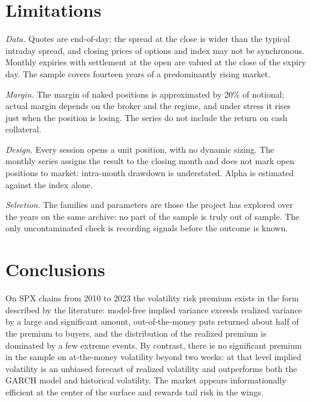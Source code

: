\documentclass[11pt,a4paper]{article}
\begin{document}
\section{Limitations}\label{sec:limiti}

\emph{Data.} Quotes are end-of-day; the spread at the close is wider than the typical intraday spread, and closing prices of options and index may not be synchronous. Monthly expiries with settlement at the open are valued at the close of the expiry day. The sample covers fourteen years of a predominantly rising market.

\emph{Margin.} The margin of naked positions is approximated by 20\% of notional; actual margin depends on the broker and the regime, and under stress it rises just when the position is losing. The series do not include the return on cash collateral.

\emph{Design.} Every session opens a unit position, with no dynamic sizing. The monthly series assigns the result to the closing month and does not mark open positions to market: intra-month drawdown is understated. Alpha is estimated against the index alone.

\emph{Selection.} The families and parameters are those the project has explored over the years on the same archive: no part of the sample is truly out of sample. The only uncontaminated check is recording signals before the outcome is known.

\section{Conclusions}\label{sec:concl}

On SPX chains from 2010 to 2023 the volatility risk premium exists in the form described by the literature: model-free implied variance exceeds realized variance by a large and significant amount, out-of-the-money puts returned about half of the premium to buyers, and the distribution of the realized premium is dominated by a few extreme events. By contrast, there is no significant premium in the sample on at-the-money volatility beyond two weeks: at that level implied volatility is an unbiased forecast of realized volatility and outperforms both the GARCH model and historical volatility. The market appears informationally efficient at the center of the surface and rewards tail risk in the wings.
\end{document}
